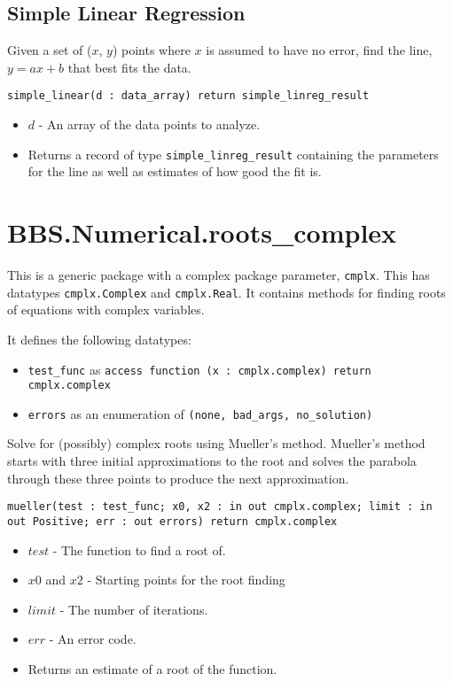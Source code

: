 \documentclass[10pt, openany]{book}
\newcommand{\function}[1]{\texttt{#1}}
\newcommand{\datatype}[1]{\texttt{#1}}
\begin{document}
\subsection{Simple Linear Regression}
Given a set of ($x$, $y$) points where $x$ is assumed to have no error, find the line, $y=ax+b$ that best fits the data.

\function{simple\_linear(d : data\_array) return simple\_linreg\_result}
\begin{itemize}
  \item $d$ - An array of the data points to analyze.
  \item Returns a record of type \datatype{simple\_linreg\_result} containing the parameters for the line as well as estimates of how good the fit is.
\end{itemize}

\section{BBS.Numerical.roots\_complex}
This is a generic package with a complex package parameter, \datatype{cmplx}.  This has datatypes \datatype{cmplx.Complex} and \datatype{cmplx.Real}.  It contains methods for finding roots of equations with complex variables.

It defines the following datatypes:
\begin{itemize}
   \item \datatype{test\_func} as \datatype{access function (x : cmplx.complex) return cmplx.complex}
   \item \datatype{errors} as an enumeration of \datatype{(none, bad\_args, no\_solution)}
\end{itemize}

Solve for (possibly) complex roots using Mueller's method.  Mueller's method starts with three initial approximations to the root and solves the parabola through these three points to produce the next approximation.

\function{mueller(test : test\_func; x0, x2 : in out cmplx.complex; limit : in out Positive; err : out errors) return cmplx.complex}
\begin{itemize}
  \item $test$ - The function to find a root of.
  \item $x0$ and $x2$ - Starting points for the root finding
  \item $limit$ - The number of iterations.
  \item $err$ - An error code.
  \item Returns an estimate of a root of the function.
\end{itemize}
\end{document}
